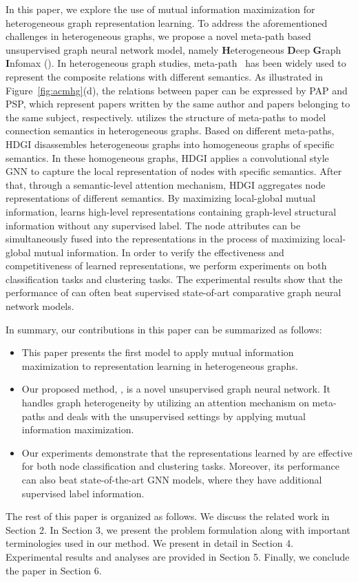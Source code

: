 \documentclass[conference]{IEEEtran}
\begin{document}
	In this paper, we explore the use of mutual information maximization for heterogeneous graph representation learning. To address the aforementioned challenges in heterogeneous graphs, we propose a novel meta-path based unsupervised graph neural network model, namely \textbf{H}eterogeneous \textbf{D}eep \textbf{G}raph \textbf{I}nfomax ({\our}). In heterogeneous graph studies, meta-path~\cite{SHYYW11} has been widely used to represent the composite relations with different semantics. As illustrated in Figure~\ref{fig:acmhg}(d), the relations between paper can be expressed by PAP and PSP, which represent papers written by the same author and papers belonging to the same subject, respectively. 
	{\our} utilizes the structure of meta-paths to model connection semantics in heterogeneous graphs. Based on different meta-paths, HDGI disassembles heterogeneous graphs into homogeneous graphs of specific semantics. In these homogeneous graphs, HDGI applies a convolutional style GNN to capture the local representation of nodes with specific semantics. After that, through a semantic-level attention mechanism, HDGI aggregates node representations of different semantics. By maximizing local-global mutual information, {\our} learns high-level representations containing graph-level structural information without any supervised label. The node attributes can be simultaneously fused into the representations in the process of maximizing local-global mutual information. In order to verify the effectiveness and competitiveness of learned representations, we perform experiments on both classification tasks and clustering tasks. The experimental results show that the performance of {\our} can often beat supervised state-of-art comparative graph neural network models.
	
	
	In summary, our contributions in this paper can be summarized as follows:
	\begin{itemize}[leftmargin=*]
		\item This paper presents the first model to apply mutual information maximization to representation learning in heterogeneous graphs.
		\item Our proposed method, {\our}, is a novel unsupervised graph neural network. It handles graph heterogeneity by utilizing an attention mechanism on meta-paths and deals with the unsupervised settings by applying mutual information maximization.
		\item Our experiments demonstrate that the representations learned by {\our} are effective for both node classification and clustering tasks. Moreover, its performance can also beat state-of-the-art GNN models, where they have additional supervised label information.
	\end{itemize}
The rest of this paper is organized as follows. We discuss the related work in Section 2. In Section 3, we present the problem formulation along with important terminologies used in our method. We present {\our} in detail in Section 4. Experimental results and analyses are provided in Section 5. Finally, we conclude the paper in Section 6.
\end{document}
